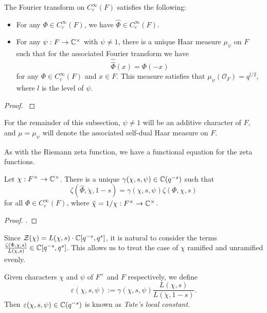 \begin{prop}
    The Fourier transform on $C_c^\infty(F)$ satisfies the following:
    \begin{itemize}
        \item For any $\Phi \in C_c^\infty(F)$, we have $\hat{\Phi} \in C_c^\infty(F)$.
        \item For any $\psi: F \to \mathbb{C}^\times$ with $\psi \neq 1$, there is a unique Haar measure $\mu_\psi$ on $F$ such that for the associated Fourier transform we have $$\hat{\hat{\Phi}}(x) = \Phi(-x)$$ for any $\Phi \in C_c^\infty(F)$ and $x \in F$. This measure satisfies that $\mu_\psi(\mathcal{O}_F)=q^{l/2}$, where $l$ is the level of $\psi$.
    \end{itemize}
    
\end{prop}
\begin{proof}
    \cite[Proposition 23.1]{BH1}
\end{proof}

\begin{notn}
    For the remainder of this subsection, $\psi \neq 1$ will be an additive character of $F$, and $\mu= \mu_\psi$ will denote the associated self-dual Haar measure on $F$.
\end{notn}

As with the Riemann zeta function, we have a functional equation for the zeta functions.

\begin{thm}\label{thm:gl1gamma}
    Let $\chi: F^\times \to \mathbb{C}^\times$. There is a unique $\gamma(\chi,s,\psi) \in \mathbb{C}(q^{-s})$ such that 
    $$\zeta(\hat{\Phi}, \check{\chi},1-s) = \gamma(\chi,s,\psi) \zeta(\Phi,\chi,s)$$ for all $\Phi \in C_c^\infty(F)$, where $\check{\chi}=1/\chi : F^\times \to \mathbb{C}^\times$.
\end{thm}
\begin{proof}
    \cite[Theorem 23.3]{BH1}.
\end{proof}

Since $\mathcal Z(\chi) = L(\chi,s)\cdot \mathbb{C}[q^{-s},q^s]$, it is natural to consider the terms $\frac{\zeta(\Phi,\chi,s)}{L(\chi,s)} \in \mathbb{C}[q^{-s},q^s]$. This allows us to treat the case of $\chi$ ramified and unramified evenly. 

\begin{defn}
    Given characters $\chi$ and $\psi$ of $F^\times$ and $F$ respectively,  we define %
    $$\varepsilon(\chi,s,\psi) := \gamma(\chi,s,\psi)\frac{L(\chi,s)}{L(\check{\chi},1-s)}.$$
    Then $\varepsilon(\chi,s,\psi)\in\mathbb{C}(q^{-s})$ is known as \textit{Tate's local constant}.
\end{defn}

